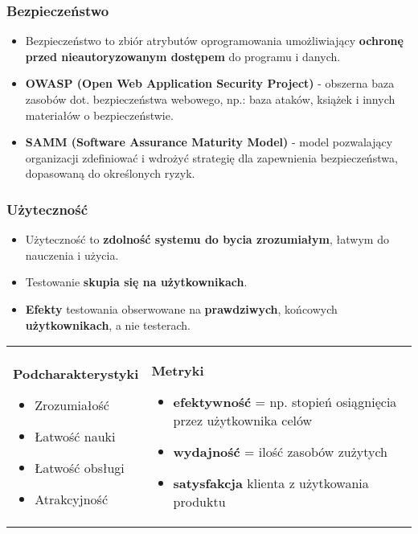 \documentclass[../main.tex]{subfiles}
\begin{document}
    \subsubsection{Bezpieczeństwo}
    \begin{itemize}
        \item Bezpieczeństwo to zbiór atrybutów oprogramowania umożliwiający \textbf{ochronę przed nieautoryzowanym
        dostępem} do programu i danych.
        \item \textbf{OWASP (Open Web Application Security Project)} - obszerna baza zasobów dot. bezpieczeństwa webowego, np.:
        baza ataków, książek i innych materiałów o bezpieczeństwie.
        \item \textbf{SAMM (Software Assurance Maturity Model)} - model pozwalający organizacji zdefiniować i wdrożyć strategię dla zapewnienia bezpieczeństwa,
        dopasowaną do określonych ryzyk.
    \end{itemize}

    \subsubsection{Użyteczność}
    \begin{itemize}
        \item Użyteczność to \textbf{zdolność systemu do bycia zrozumiałym}, łatwym do nauczenia i użycia.
        \item Testowanie \textbf{skupia się na użytkownikach}.
        \item \textbf{Efekty} testowania obserwowane na \textbf{prawdziwych}, końcowych \textbf{użytkownikach}, a nie testerach.
    \end{itemize}

    \begin{table}[H]
        \begin{center}
            \begin{tabular}{p{5cm} p{11cm}}
                \textbf{Podcharakterystyki}
                \begin{itemize}
                    \item Zrozumiałość
                    \item Łatwość nauki
                    \item Łatwość obsługi
                    \item Atrakcyjność
                \end{itemize}
                &
                \textbf{Metryki}
                \begin{itemize}
                    \item \textbf{efektywność} = np. stopień osiągnięcia przez użytkownika celów
                    \item \textbf{wydajność} = ilość zasobów zużytych
                    \item \textbf{satysfakcja} klienta z użytkowania produktu
                \end{itemize}
            \end{tabular}
        \end{center}
    \end{table}
\end{document}
